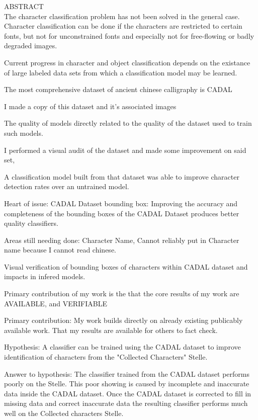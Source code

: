 ABSTRACT\\

The character classification problem has not been solved in the general case.  Character classification can be done if the characters are restricted to certain fonts, but not for unconstrained fonts and especially not for free-flowing or badly degraded images.

Current progress in character and object classification depends on the existance of large labeled data sets from which a classification model may be learned.

The most comprehensive dataset of ancient chinese calligraphy is CADAL

I made a copy of this dataset and it's associated images

The quality of models directly related to the quality of the dataset used to train such models.

I performed a visual audit of the dataset and made some improvement on said set,

A classification model built from that dataset was able to improve character detection rates over an untrained model.

Heart of issue:  CADAL Dataset bounding box:  Improving the accuracy and completeness of the bounding boxes of the CADAL Dataset produces better quality classifiers.


Areas still needing done:  Character Name,  Cannot reliably put in Character name because I cannot read chinese.

Visual verification of bounding boxes of characters within CADAL dataset and impacts in infered models.


Primary contribution of my work is the that the core results of my work are AVAILABLE, and VERIFIABLE

Primary contribution:  My work builds directly on already existing publicably available work.  That my results are available for others to fact check.

Hypothesis:  A classifier can be trained using the CADAL dataset to improve identification of characters from the "Collected Characters" Stelle.

Answer to hypothesis:  The classifier trained from the CADAL dataset performs poorly on the Stelle.  This poor showing is caused by incomplete and inaccurate data inside the CADAL dataset.  Once the CADAL dataset is corrected to fill in missing data and correct inaccurate data the resulting classifier performs much well on the Collected characters Stelle.

\newpage
